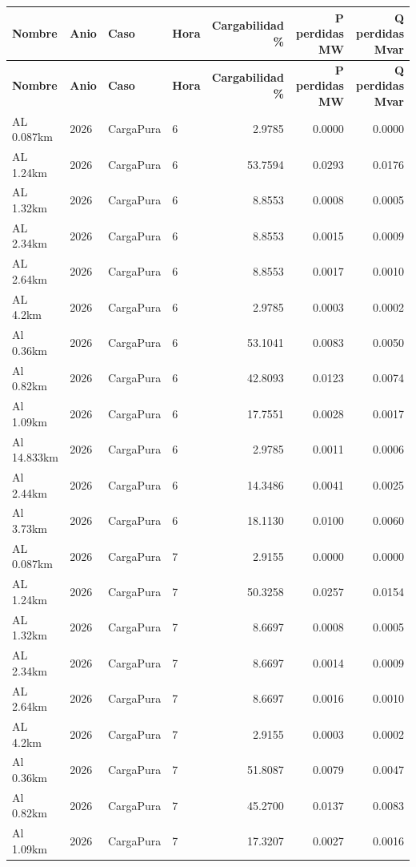\documentclass[11pt,a4paper]{article}
\begin{document}
\small
\begin{longtable}{llllrrr}
\toprule
\textbf{Nombre} & \textbf{Anio} & \textbf{Caso} & \textbf{Hora} & \textbf{Cargabilidad \%} & \textbf{P perdidas MW} & \textbf{Q perdidas Mvar} \\
\midrule
\endfirsthead
\toprule
\textbf{Nombre} & \textbf{Anio} & \textbf{Caso} & \textbf{Hora} & \textbf{Cargabilidad \%} & \textbf{P perdidas MW} & \textbf{Q perdidas Mvar} \\
\midrule
\endhead
\bottomrule
\endfoot
AL 0.087km & 2026 & CargaPura & 6 & 2.9785 & 0.0000 & 0.0000 \\
AL 1.24km & 2026 & CargaPura & 6 & 53.7594 & 0.0293 & 0.0176 \\
AL 1.32km & 2026 & CargaPura & 6 & 8.8553 & 0.0008 & 0.0005 \\
AL 2.34km & 2026 & CargaPura & 6 & 8.8553 & 0.0015 & 0.0009 \\
AL 2.64km & 2026 & CargaPura & 6 & 8.8553 & 0.0017 & 0.0010 \\
AL 4.2km & 2026 & CargaPura & 6 & 2.9785 & 0.0003 & 0.0002 \\
Al 0.36km & 2026 & CargaPura & 6 & 53.1041 & 0.0083 & 0.0050 \\
Al 0.82km & 2026 & CargaPura & 6 & 42.8093 & 0.0123 & 0.0074 \\
Al 1.09km & 2026 & CargaPura & 6 & 17.7551 & 0.0028 & 0.0017 \\
Al 14.833km & 2026 & CargaPura & 6 & 2.9785 & 0.0011 & 0.0006 \\
Al 2.44km & 2026 & CargaPura & 6 & 14.3486 & 0.0041 & 0.0025 \\
Al 3.73km & 2026 & CargaPura & 6 & 18.1130 & 0.0100 & 0.0060 \\
AL 0.087km & 2026 & CargaPura & 7 & 2.9155 & 0.0000 & 0.0000 \\
AL 1.24km & 2026 & CargaPura & 7 & 50.3258 & 0.0257 & 0.0154 \\
AL 1.32km & 2026 & CargaPura & 7 & 8.6697 & 0.0008 & 0.0005 \\
AL 2.34km & 2026 & CargaPura & 7 & 8.6697 & 0.0014 & 0.0009 \\
AL 2.64km & 2026 & CargaPura & 7 & 8.6697 & 0.0016 & 0.0010 \\
AL 4.2km & 2026 & CargaPura & 7 & 2.9155 & 0.0003 & 0.0002 \\
Al 0.36km & 2026 & CargaPura & 7 & 51.8087 & 0.0079 & 0.0047 \\
Al 0.82km & 2026 & CargaPura & 7 & 45.2700 & 0.0137 & 0.0083 \\
Al 1.09km & 2026 & CargaPura & 7 & 17.3207 & 0.0027 & 0.0016 \\

\end{longtable}
\end{document}
